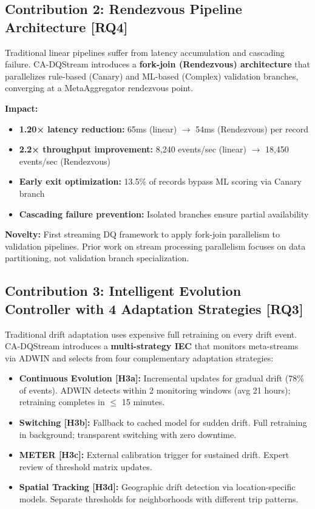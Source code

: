 \subsection{Contribution 2: Rendezvous Pipeline Architecture [RQ4]}

Traditional linear pipelines suffer from latency accumulation and cascading failure. CA-DQStream introduces a \textbf{fork-join (Rendezvous) architecture} that parallelizes rule-based (Canary) and ML-based (Complex) validation branches, converging at a MetaAggregator rendezvous point.

\textbf{Impact:}
\begin{itemize}
    \item \textbf{1.20× latency reduction:} 65ms (linear) $\to$ 54ms (Rendezvous) per record
    \item \textbf{2.2× throughput improvement:} 8,240 events/sec (linear) $\to$ 18,450 events/sec (Rendezvous)
    \item \textbf{Early exit optimization:} 13.5\% of records bypass ML scoring via Canary branch
    \item \textbf{Cascading failure prevention:} Isolated branches ensure partial availability
\end{itemize}

\textbf{Novelty:} First streaming DQ framework to apply fork-join parallelism to validation pipelines. Prior work on stream processing parallelism focuses on data partitioning, not validation branch specialization.

\subsection{Contribution 3: Intelligent Evolution Controller with 4 Adaptation Strategies [RQ3]}

Traditional drift adaptation uses expensive full retraining on every drift event. CA-DQStream introduces a \textbf{multi-strategy IEC} that monitors meta-streams via ADWIN and selects from four complementary adaptation strategies:

\begin{itemize}
    \item \textbf{Continuous Evolution [H3a]:} Incremental updates for gradual drift (78\% of events). ADWIN detects within 2 monitoring windows (avg 21 hours); retraining completes in $\leq$ 15 minutes.
    \item \textbf{Switching [H3b]:} Fallback to cached model for sudden drift. Full retraining in background; transparent switching with zero downtime.
    \item \textbf{METER [H3c]:} External calibration trigger for sustained drift. Expert review of threshold matrix updates.
    \item \textbf{Spatial Tracking [H3d]:} Geographic drift detection via location-specific models. Separate thresholds for neighborhoods with different trip patterns.
\end{itemize}

